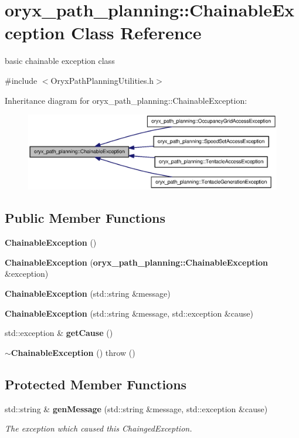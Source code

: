 \section{oryx\-\_\-path\-\_\-planning\-:\-:\-Chainable\-Exception \-Class \-Reference}
\label{classoryx__path__planning_1_1ChainableException}


basic chainable exception class  




{\ttfamily \#include $<$\-Oryx\-Path\-Planning\-Utilities.\-h$>$}



\-Inheritance diagram for oryx\-\_\-path\-\_\-planning\-:\-:\-Chainable\-Exception\-:
\nopagebreak
\begin{figure}[H]
\begin{center}
\leavevmode
\includegraphics[width=350pt]{classoryx__path__planning_1_1ChainableException__inherit__graph}
\end{center}
\end{figure}
\subsection*{\-Public \-Member \-Functions}
\begin{DoxyCompactItemize}
\item 
{\bf \-Chainable\-Exception} ()
\item 
{\bf \-Chainable\-Exception} ({\bf oryx\-\_\-path\-\_\-planning\-::\-Chainable\-Exception} \&exception)
\item 
{\bf \-Chainable\-Exception} (std\-::string \&message)
\item 
{\bf \-Chainable\-Exception} (std\-::string \&message, std\-::exception \&cause)
\item 
std\-::exception \& {\bf get\-Cause} ()
\item 
{\bf $\sim$\-Chainable\-Exception} ()  throw ()
\end{DoxyCompactItemize}
\subsection*{\-Protected \-Member \-Functions}
\begin{DoxyCompactItemize}
\item 
std\-::string \& {\bf gen\-Message} (std\-::string \&message, std\-::exception \&cause)
\begin{DoxyCompactList}\small\item\em \-The exception which caused this \-Chainged\-Exception. \end{DoxyCompactList}\end{DoxyCompactItemize}
